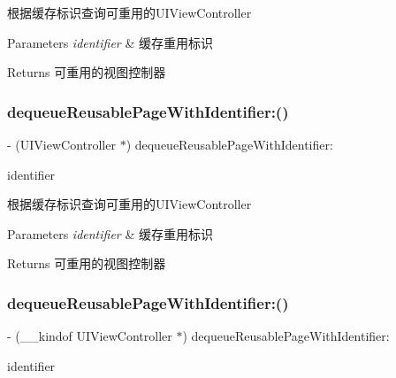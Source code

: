 根据缓存标识查询可重用的\+U\+I\+View\+Controller


\begin{DoxyParams}{Parameters}
{\em identifier} & 缓存重用标识\\
\hline
\end{DoxyParams}
\begin{DoxyReturn}{Returns}
可重用的视图控制器 
\end{DoxyReturn}
\mbox{\label{interface_v_t_content_view_a79bbce699a927322b460d949b1f16262}} 
\subsubsection{\texorpdfstring{dequeue\+Reusable\+Page\+With\+Identifier\+:()}{dequeueReusablePageWithIdentifier:()}\hspace{0.1cm}{\footnotesize\ttfamily [2/3]}}
{\footnotesize\ttfamily -\/ (U\+I\+View\+Controller $\ast$) dequeue\+Reusable\+Page\+With\+Identifier\+: \begin{DoxyParamCaption}\item[{(N\+S\+String $\ast$)}]{identifier }\end{DoxyParamCaption}}

根据缓存标识查询可重用的\+U\+I\+View\+Controller


\begin{DoxyParams}{Parameters}
{\em identifier} & 缓存重用标识\\
\hline
\end{DoxyParams}
\begin{DoxyReturn}{Returns}
可重用的视图控制器 
\end{DoxyReturn}
\mbox{\label{interface_v_t_content_view_a81541fa49650eb0f8aa1ddca90798247}} 
\subsubsection{\texorpdfstring{dequeue\+Reusable\+Page\+With\+Identifier\+:()}{dequeueReusablePageWithIdentifier:()}\hspace{0.1cm}{\footnotesize\ttfamily [3/3]}}
{\footnotesize\ttfamily -\/ (\+\_\+\+\_\+kindof U\+I\+View\+Controller $\ast$) dequeue\+Reusable\+Page\+With\+Identifier\+: \begin{DoxyParamCaption}\item[{(N\+S\+String $\ast$)}]{identifier }\end{DoxyParamCaption}}

